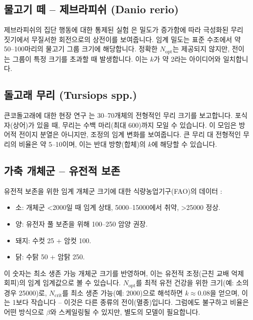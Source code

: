 \documentclass[12pt]{article}
\theoremstyle{remark}
\begin{document}
	\subsection{물고기 떼 – 제브라피쉬 (Danio rerio)}
	\label{subsec:fish}
	
	제브라피쉬의 집단 행동에 대한 통제된 실험 \cite{Tunstrom2013}은 밀도가 증가함에 따라 극성화된 무리 짓기에서 무질서한 회전으로의 상전이를 보여줍니다. 임계 밀도는 표준 수조에서 약 50–100마리의 물고기 그룹 크기에 해당합니다. 정확한 \(N_{\text{opt}}\)는 제공되지 않지만, 전이는 그룹이 특정 크기를 초과할 때 발생합니다. 이는 \(k\)가 약 2라는 아이디어와 일치합니다.
	
	\subsection{돌고래 무리 (Tursiops spp.)}
	\label{subsec:dolphins}
	
	큰코돌고래에 대한 현장 연구 \cite{Connor2000}는 30–70개체의 전형적인 무리 크기를 보고합니다. 포식자(상어)가 있을 때, 무리는 수백 마리(최대 600)까지 모일 수 있습니다. 이 모임은 방어적 전이지 분열은 아니지만, 조정의 임계 변화를 보여줍니다. 큰 무리 대 전형적인 무리의 비율은 약 5–10이며, 이는 반대 방향(합체)의 \(k\)에 해당할 수 있습니다.
	
	\subsection{가축 개체군 – 유전적 보존}
	\label{subsec:livestock}
	
	유전적 보존을 위한 임계 개체군 크기에 대한 식량농업기구(FAO)의 데이터 \cite{FAO2013}:
	\begin{itemize}
		\item 소: 개체군 <2000일 때 임계 상태, 5000–15000에서 취약, >25000 정상.
		\item 양: 유전자 풀 보존을 위해 100–250 암양 권장.
		\item 돼지: 수컷 25 + 암컷 100.
		\item 닭: 수탉 50 + 암탉 250.
	\end{itemize}
	이 숫자는 최소 생존 가능 개체군 크기를 반영하며, 이는 유전적 조정(근친 교배 억제 회피)의 임계 임계값으로 볼 수 있습니다. \(N_{\text{opt}}\)를 최적 유전 건강을 위한 크기(예: 소의 경우 25000)로, \(N_{\text{crit}}\)를 최소 생존 가능(예: 2000)으로 해석하면 \(k \approx 0.08\)을 얻으며, 이는 1보다 작습니다 – 이것은 다른 종류의 전이(멸종)입니다. 그럼에도 불구하고 비율은 어떤 방식으로 \(\beta\)와 스케일링될 수 있지만, 별도의 모델이 필요합니다.
	
\end{document}
